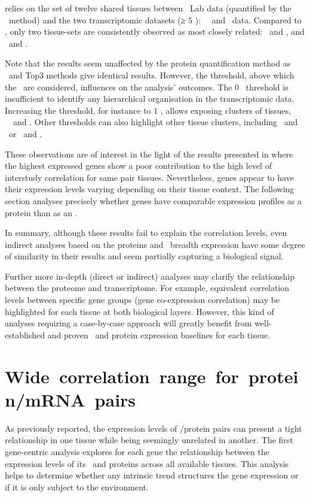  relies on the set of twelve shared tissues between
\pandey\ Lab data (quantified by the \PPKM\ method)
and the two transcriptomic datasets (≥ $5$ \FPKM): \uhlen\ \etal\ and \gtex\ data.
Compared to ,
only two tissue-sets are consistently observed
as most closely related: \Testis\ and \Ovary, and \Liver\ and \Kidney.

Note that the results seem unaffected by the protein quantification method
as \PPKM\ and Top3 methods give identical results.
However, the threshold,
above which the \mRNAs\ are considered,
influences on the analysis' outcomes.
The $0$ \FPKM\ threshold is insufficient
to identify any hierarchical organisation in the transcriptomic data.
Increasing the threshold,
for instance to $1$ \FPKM,
allows exposing clusters of tissues, \eg\ \Liver\ and \Kidney{}.
Other thresholds can also highlight other tissue clusters,
including \Rectum\ and \hColon\ or \Pancreas\ and \Gall{}.

These observations are of interest in the light of the results
presented in 
where the highest expressed genes show a poor contribution
to the high level of interstudy correlation for same pair tissues.
Nevertheless,
genes appear to have their expression levels varying
depending on their tissue context.
The following section  analyses precisely
whether genes have comparable expression profiles
as a protein than as an \mRNA{}.\mybr\

In summary, although these results fail to explain the correlation levels,
even indirect analyses based on the proteins and \mRNAs\ breadth expression
have some degree of similarity in their results
and seem partially capturing a biological signal.\mybr\

Further more in-depth (direct or indirect)  analyses
may clarify the relationship between the proteome and transcriptome.
For example, equivalent correlation levels between specific gene groups
(gene co-expression correlation) may be highlighted
for each tissue at both biological layers.
However, this kind of analyses requiring a case-by-case approach
will greatly benefit from
well-established and proven \mRNA\ and protein expression baselines
for each tissue.


\section{Wide~correlation~range~for~protein/mRNA~pairs}\label{sec:GenesCorRNAProt}
As previously reported, %
the expression levels of \mRNA/protein pairs can present
a tight relationship in one tissue
while being seemingly unrelated in another.
The first gene-centric analysis explores for each gene
the relationship between the expression levels of its \mRNAs\ and proteins
across all available tissues.
This analysis helps to determine
whether any intrinsic trend structures the gene expression
or if it is only subject to the environment.

